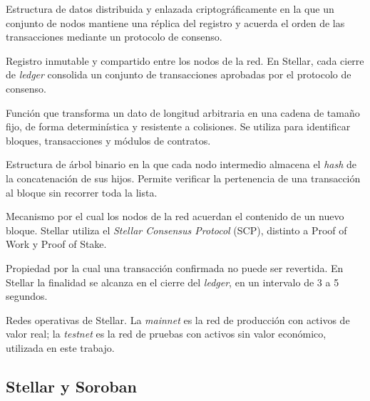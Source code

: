 \begin{description}\setlength{\itemsep}{2pt}
\item[Blockchain (cadena de bloques)] Estructura de datos distribuida y enlazada criptográficamente en la que un conjunto de nodos mantiene una réplica del registro y acuerda el orden de las transacciones mediante un protocolo de consenso.
\item[Ledger (libro mayor distribuido)] Registro inmutable y compartido entre los nodos de la red. En Stellar, cada cierre de \textit{ledger} consolida un conjunto de transacciones aprobadas por el protocolo de consenso.
\item[Hash criptográfico] Función que transforma un dato de longitud arbitraria en una cadena de tamaño fijo, de forma determinística y resistente a colisiones. Se utiliza para identificar bloques, transacciones y módulos de contratos.
\item[Árbol de Merkle] Estructura de árbol binario en la que cada nodo intermedio almacena el \textit{hash} de la concatenación de sus hijos. Permite verificar la pertenencia de una transacción al bloque sin recorrer toda la lista.
\item[Consenso] Mecanismo por el cual los nodos de la red acuerdan el contenido de un nuevo bloque. Stellar utiliza el \textit{Stellar Consensus Protocol} (SCP), distinto a Proof of Work y Proof of Stake.
\item[Finalidad (\textit{finality})] Propiedad por la cual una transacción confirmada no puede ser revertida. En Stellar la finalidad se alcanza en el cierre del \textit{ledger}, en un intervalo de 3 a 5 segundos.
\item[Mainnet / Testnet] Redes operativas de Stellar. La \textit{mainnet} es la red de producción con activos de valor real; la \textit{testnet} es la red de pruebas con activos sin valor económico, utilizada en este trabajo.
\end{description}

\subsection*{Stellar y Soroban}

